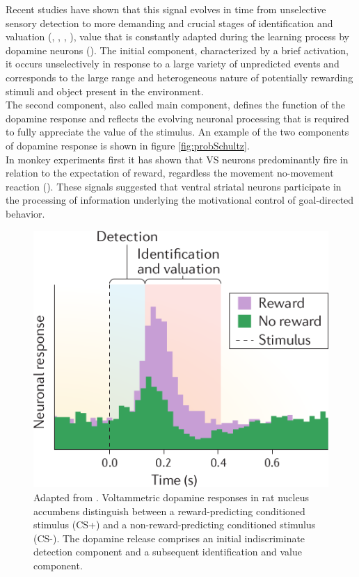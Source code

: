 Recent studies have shown that this signal evolves in time from unselective sensory detection to more demanding and crucial stages of identification and valuation (\cite{Tobler2003}, \cite{Nomoto2010}, \cite{Fiorillo2013}, \cite{Schultz2016}), value that is constantly adapted during the learning process by dopamine neurons (\cite{Tobler2005}). The initial component, characterized by a brief activation, it occurs unselectively in response to a large variety of unpredicted events and corresponds to the large range and heterogeneous nature of potentially rewarding stimuli and object present in the environment.\\The second component, also called main component, defines the function of the dopamine response and reflects the evolving neuronal processing that is required to fully appreciate the value of the stimulus. An example of the two components of dopamine response is shown in figure \ref{fig:probSchultz}.\\In monkey experiments first it has shown that VS neurons predominantly fire in relation to the expectation of reward, regardless the movement no-movement reaction (\cite{Schultz1992}).
These signals suggested that ventral striatal neurons participate in the processing of information underlying the motivational control of goal-directed behavior.\\
\begin{figure}
    \centering
    \includegraphics[scale=0.4]{figures/Schultz2016CSMod.png}
    \caption{Adapted from \cite{Schultz2016}. Voltammetric dopamine responses in rat nucleus accumbens distinguish between a reward-predicting conditioned stimulus (CS+) and a non-reward-predicting conditioned stimulus (CS-). The dopamine release comprises an initial indiscriminate detection component and a subsequent identification and value component.}
    \label{fig:dopCS}
\end{figure}

